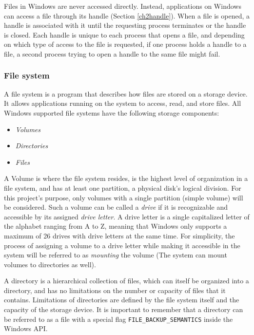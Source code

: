 Files in Windows are never accessed directly. Instead, applications on Windows can access a file through its handle (Section \ref{ch2handle}). When a file is opened, a handle is associated with it until the requesting process terminates or the handle is closed. Each handle is unique to each process that opens a file, and depending on which type of access to the file is requested, if one process holds a handle to a file, a second process trying to open a handle to the same file might fail.\cite{FileHandles}

\subsubsection{File system}
A file system is a program that describes how files are stored on a storage device. It allows applications running on the system to access, read, and store files. All Windows supported file systems have the following storage components:\cite{LocalFileSystems}

\begin{itemize}
    \item \textit{Volumes}
    \item \textit{Directories}
    \item \textit{Files}
\end{itemize}

A Volume is where the file system resides, is the highest level of organization in a file system, and has at least one partition, a physical disk's logical division.\cite{WinVolumeMgmt} For this project's purpose, only volumes with a single partition (simple volume) will be considered. Such a volume can be called a \textit{drive} if it is recognizable and accessible by its assigned \textit{drive letter}. 
A drive letter is a single capitalized letter of the alphabet ranging from A to Z, meaning that Windows only supports a maximum of 26 drives with drive letters at the same time. For simplicity, the process of assigning a volume to a drive letter while making it accessible in the system will be referred to as \textit{mounting} the volume (The system can mount volumes to directories as well).

A directory is a hierarchical collection of files, which can itself be organized into a directory, and has no limitations on the number or capacity of files that it contains. Limitations of directories are defined by the file system itself and the capacity of the storage device.\cite{WinDirectoryMgmt} It is important to remember that a directory can be referred to as a file with a special flag \lstinline{FILE_BACKUP_SEMANTICS} inside the Windows API.


